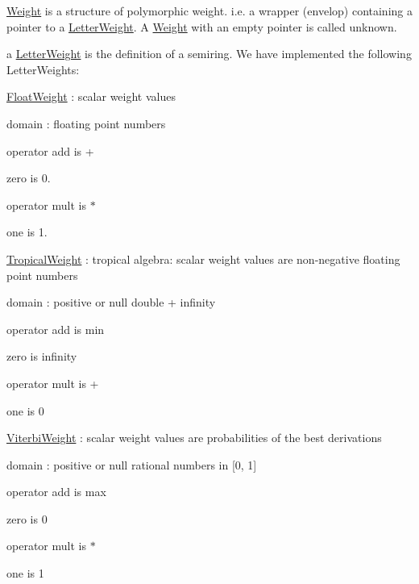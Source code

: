\begin{DoxyItemize}
\item {\ttfamily \mbox{\hyperlink{classWeight}{Weight}}} is a structure of polymorphic weight. i.\+e. a wrapper (envelop) containing a pointer to a {\ttfamily \mbox{\hyperlink{classLetterWeight}{Letter\+Weight}}}. A {\ttfamily \mbox{\hyperlink{classWeight}{Weight}}} with an empty pointer is called unknown.
\item a {\ttfamily \mbox{\hyperlink{classLetterWeight}{Letter\+Weight}}} is the definition of a semiring. We have implemented the following {\ttfamily Letter\+Weights}\+:
\item {\ttfamily \mbox{\hyperlink{classFloatWeight}{Float\+Weight}}} \+: scalar weight values
\begin{DoxyItemize}
\item domain \+: floating point numbers
\item operator {\ttfamily add} is +
\item {\ttfamily zero} is 0.
\item operator {\ttfamily mult} is $\ast$
\item {\ttfamily one} is 1.
\end{DoxyItemize}
\item {\ttfamily \mbox{\hyperlink{classTropicalWeight}{Tropical\+Weight}}} \+: tropical algebra\+: scalar weight values are non-\/negative floating point numbers
\begin{DoxyItemize}
\item domain \+: positive or null double + infinity
\item operator {\ttfamily add} is min
\item {\ttfamily zero} is infinity
\item operator {\ttfamily mult} is +
\item {\ttfamily one} is 0
\end{DoxyItemize}
\item {\ttfamily \mbox{\hyperlink{classViterbiWeight}{Viterbi\+Weight}}} \+: scalar weight values are probabilities of the best derivations
\begin{DoxyItemize}
\item domain \+: positive or null rational numbers in \mbox{[}0, 1\mbox{]}
\item operator {\ttfamily add} is max
\item {\ttfamily zero} is 0
\item operator {\ttfamily mult} is $\ast$
\item {\ttfamily one} is 1

\end{DoxyItemize}
\end{DoxyItemize}
